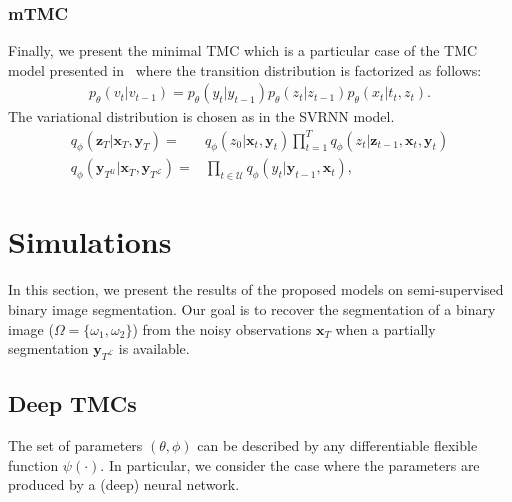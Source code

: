 \documentclass{article}
\def\x{{\mathbf x}}
\def\z{{\mathbf z}}
\def\y{{\mathbf y}}
\def\yl{{\mathbf y}_{T^{\mathcal{L}}}}
\def\yu{{\mathbf y}_{T^{\mathcal{U}}}}
\def\p{p_{\theta}}
\def\q{q_\phi}
\def\U{\mathcal{U}}
\begin{document}
\subsubsection{mTMC}
Finally, we present the minimal TMC which  is a particular case of 
the TMC model  presented in~\cite{gangloff2023deep}
where 
the transition distribution is factorized as follows:
\begin{align}
    \label{eq:mTMC}
    \p(v_t|v_{t-1}) \!= \!\p(y_t|y_{t-1}) \p(z_t|z_{t-1}) \p(x_t|t_t,z_t) \text{.}
\end{align}
The variational distribution is chosen as in the SVRNN model.
\begin{align*}
    \q(\z_T| \x_T, \y_T ) =&  \q(z_0|\x_t, \y_t) \prod_{t=1}^T \q(z_t|\z_{t-1},\x_t, \y_t)  \\
    \q(\yu| \x_T, \yl )=& \prod_{t\in  \U} \q(y_t|\y_{t-1}, \x_t) \text{,}
\end{align*}

\section{Simulations}
\label{sec:simulation}
In this section, we present the results of the proposed models on
semi-supervised binary image segmentation. Our goal is to recover the segmentation of a binary image 
($\Omega=\{\omega_1,\omega_2\}$) from the noisy observations
$\x_T$ when a partially segmentation $\yl$ is available.

\subsection{Deep TMCs}
\label{subsec:deepTMC}
The set of parameters $(\theta, \phi)$  
can be described by any differentiable flexible function $\psi(\cdot)$. 
In particular, we consider the case where the parameters are
produced by a (deep) neural network. 
\end{document}
